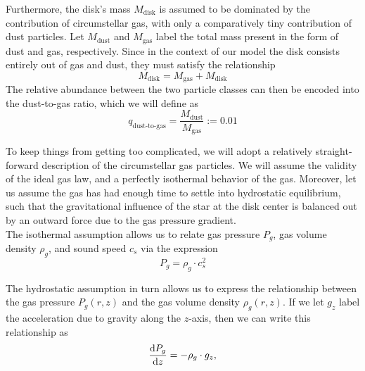         Furthermore, the disk's mass $M_\text{disk}$ is assumed to be dominated by the contribution 
        of circumstellar gas, with only a comparatively tiny contribution of dust particles.
        Let $M_\text{dust}$ and $M_\text{gas}$ label the total mass present in the form of dust 
        and gas, respectively. Since in the context of our model the disk consists entirely out 
        of gas and dust, they must satisfy the relationship
        \begin{equation}
            M_\text{disk} = M_\text{gas} + M_\text{disk}
        \end{equation}
        The relative abundance between the two particle classes can then be encoded into the 
        dust-to-gas ratio, which we will define as
        \begin{equation}
            \label{eq:dust-to-gas_ratio}
            q_\text{dust-to-gas}=\frac{M_\text{dust}}{M_\text{gas}}:=0.01
        \end{equation}

        To keep things from getting too complicated, we will adopt a relatively straight-forward 
        description of the circumstellar gas particles. We will assume the validity of the ideal 
        gas law, and a perfectly isothermal behavior of the gas. 
        Moreover, let us assume the gas has had enough time to settle into hydrostatic equilibrium,
        such that the gravitational influence of the star at the disk center is balanced out by 
        an outward force due to the gas pressure gradient. \\

        The isothermal assumption allows us to relate gas pressure $P_g$, 
        gas volume density $\rho_g$, and sound speed $c_s$ via the expression
        \begin{equation}
            \label{eq:isothermal_condition}
            P_g = \rho_g \cdot c_s^2
        \end{equation}

        The hydrostatic assumption in turn allows us to express the relationship between 
        the gas pressure $P_g(r,z)$ and the gas volume density $\rho_g(r,z)$.
        If we let $g_z$ label the acceleration due to gravity along the $z$-axis, 
        then we can write this relationship as
        \begin{equation}
            \label{eq:hydrostatic_equilibrium}
            \deriv{P_g}{z} = - \rho_g \cdot g_z,  %
        \end{equation}

